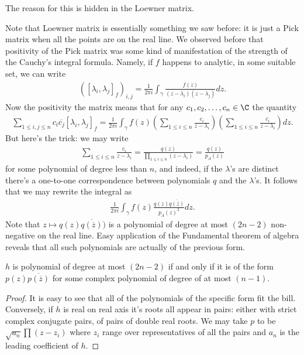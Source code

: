 The reason for this is hidden in the Loewner matrix.

Note that Loewner matrix is essentially something we saw before: it is just a Pick matrix when all the points are on the real line. We observed before that positivity of the Pick matrix was some kind of manifestation of the strength of the Cauchy's integral formula. Namely, if $f$ happens to analytic, in some suitable set, we can write
\begin{align*}
	\left([\lambda_{i}, \lambda_{j}]_{f}\right)_{i, j} = \frac{1}{2 \pi i}\int_{\gamma} \frac{f(z)}{(z - \lambda_{i})(z - \lambda_{j})} dz.
\end{align*}
Now the positivity the matrix means that for any $c_{1}, c_{2}, \ldots, c_{n} \in \C$ the quantity
\begin{align*}
	\sum_{1 \leq i, j \leq n} c_{i} \overline{c_{j}} [\lambda_{i}, \lambda_{j}]_{f} = \frac{1}{2 \pi i}\int_{\gamma}f(z) \left(\sum_{1 \leq i \leq n} \frac{c_{i}}{z - \lambda_{i}}\right) \left( \sum_{1 \leq i \leq n} \frac{\overline{c_{i}}}{z - \lambda_{i}}\right)dz.
\end{align*}
But here's the trick: we may write
\begin{align*}
	\sum_{1 \leq i \leq n} \frac{c_{i}}{z - \lambda_{i}} = \frac{q(z)}{\prod_{1 \leq i \leq n} (z - \lambda_{i})} = \frac{q(z)}{p_{\Lambda}(z)}
\end{align*}
for some polynomial of degree less than $n$, and indeed, if the $\lambda$'s are distinct there's a one-to-one correspondence between polynomials $q$ and the $\lambda$'s. It follows that we may rewrite the integral as
\begin{align*}
\frac{1}{2 \pi i}\int_{\gamma}f(z) \frac{q(z) \overline{q(\overline{z})}}{p_{\Lambda}(z)^2}dz.
\end{align*}
Note that $z \mapsto q(z)\overline{q(\overline{z})})$ is a polynomial of degree at most $(2 n - 2)$ non-negative on the real line. Easy application of the Fundamental theorem of algebra reveals that all such polynomials are actually of the previous form.

\begin{lem}\label{polynomial_lemma}
	$h$ is polynomial of degree at most $(2 n - 2)$ if and only if it is of the form $p(z) \overline{p(\overline{z})}$ for some complex polynomial of degree of at most $(n - 1)$.
\end{lem}
\begin{proof}
	It is easy to see that all of the polynomials of the specific form fit the bill. Conversely, if $h$ is real on real axis it's roots all appear in pairs: either with strict complex conjugate pairs, of pairs of double real roots. We may take $p$ to be $\sqrt{a_{n}}\prod (z - z_{i})$ where $z_{i}$ range over representatives of all the pairs and $a_{n}$ is the leading coefficient of $h$.
\end{proof}

